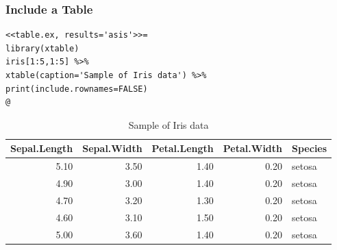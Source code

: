 \documentclass[10pt]{beamer}\usepackage[]{graphicx}\usepackage[]{color}
\makeatletter
\newenvironment{kframe}{%
 \def\at@end@of@kframe{}%
 \ifinner\ifhmode%
  \def\at@end@of@kframe{\end{minipage}}%
  \begin{minipage}{\columnwidth}%
 \fi\fi%
 \def\FrameCommand##1{\hskip\@totalleftmargin \hskip-\fboxsep
 \colorbox{shadecolor}{##1}\hskip-\fboxsep
     \hskip-\linewidth \hskip-\@totalleftmargin \hskip\columnwidth}%
 \MakeFramed {\advance\hsize-\width
   \@totalleftmargin\z@ \linewidth\hsize
   \@setminipage}}%
 {\par\unskip\endMakeFramed%
 \at@end@of@kframe}
\newenvironment{knitrout}{}{} %
\makeatother
\begin{document}
\begin{frame}[fragile]
\frametitle{Include a Table}
\scriptsize
\begin{knitrout}\footnotesize
{}\color{fgcolor}\begin{kframe}
\begin{verbatim}
<<table.ex, results='asis'>>=
library(xtable)
iris[1:5,1:5] %>% 
xtable(caption='Sample of Iris data') %>%
print(include.rownames=FALSE)
@
\end{verbatim}
\end{kframe}
\end{knitrout}
\begin{table}[ht]
\centering
\begin{tabular}{rrrrl}
  \hline
Sepal.Length & Sepal.Width & Petal.Length & Petal.Width & Species \\ 
  \hline
5.10 & 3.50 & 1.40 & 0.20 & setosa \\ 
  4.90 & 3.00 & 1.40 & 0.20 & setosa \\ 
  4.70 & 3.20 & 1.30 & 0.20 & setosa \\ 
  4.60 & 3.10 & 1.50 & 0.20 & setosa \\ 
  5.00 & 3.60 & 1.40 & 0.20 & setosa \\ 
   \hline
\end{tabular}
\caption{Sample of Iris data} 
\end{table}

\end{frame}
\end{document}
